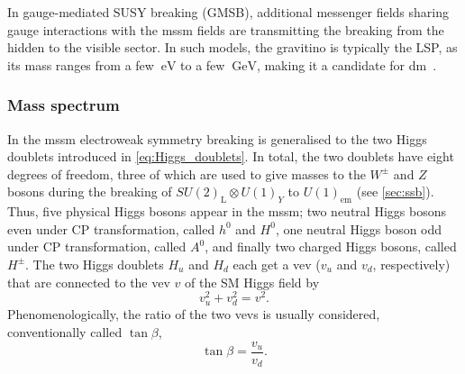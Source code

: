 In gauge-mediated SUSY breaking (GMSB), additional messenger fields sharing gauge interactions with the \gls{mssm} fields are transmitting the breaking from the hidden to the visible sector. In such models, the gravitino is typically the LSP, as its mass ranges from a few $\SI{}{\eV}$ to a few $\SI{}{\GeV}$, making it a candidate for \gls{dm}~\cite{Feng:2003xh}.

\subsubsection{Mass spectrum}

In the \gls{mssm} electroweak symmetry breaking is generalised to the two Higgs doublets introduced in \cref{eq:Higgs_doublets}. In total, the two doublets have eight degrees of freedom, three of which are used to give masses to the $W^\pm$ and $Z$ bosons during the breaking of $SU(2)_\mathrm{L}\otimes U(1)_Y$ to $U(1)_\mathrm{em}$ (see \cref{sec:ssb}). Thus, five physical Higgs bosons appear in the \gls{mssm}; two neutral Higgs bosons even under CP transformation, called $h^0$ and $H^0$, one neutral Higgs boson odd under CP transformation, called $A^0$, and finally two charged Higgs bosons, called $H^\pm$. The two Higgs doublets $H_u$ and $H_d$ each get a \gls{vev} ($v_u$ and $v_d$, respectively) that are connected to the \gls{vev} $v$ of the SM Higgs field by
\begin{equation}
	v_u^2 + v_d^2 = v^2.
\end{equation}
Phenomenologically, the ratio of the two \glspl{vev} is usually considered, conventionally called $\tan{\beta}$,
\begin{equation}
	\tan{\beta} = \frac{v_u}{v_d}.
\end{equation}

